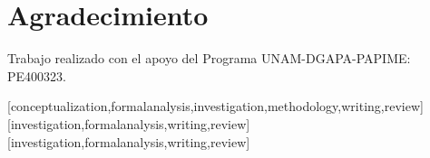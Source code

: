 \documentclass[spanish]{textolivre}
\begin{document}
\section{Agradecimiento}
Trabajo realizado con el apoyo del Programa UNAM-DGAPA-PAPIME: PE400323.

\printbibliography\label{sec-bib}
\begin{contributors}
[conceptualization,formalanalysis,investigation,methodology,writing,review]
[investigation,formalanalysis,writing,review]
[investigation,formalanalysis,writing,review]
\end{contributors}
\end{document}
